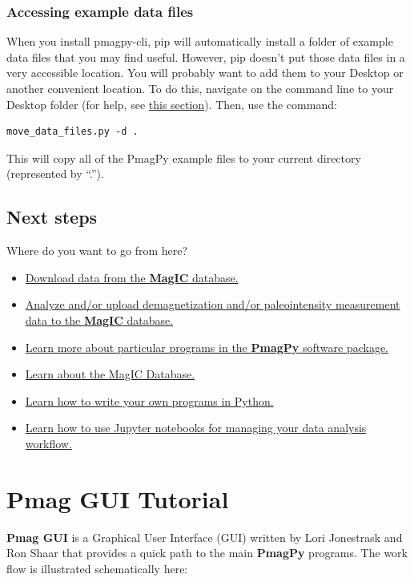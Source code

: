 \documentclass[11pt]{book}
\begin{document}
{   \subsection{Accessing example data files}
   When you install pmagpy-cli, pip will automatically install a folder of example data files that you may find useful.  However, pip doesn't put those data files in a very accessible location.  You will probably want to add them to your Desktop or another convenient location.
   To do this, navigate on the command line to your Desktop folder (for help, see \href{#file_system}{this section}).  Then, use the command: \begin{verbatim}move_data_files.py -d .\end{verbatim}This will copy all of the PmagPy example files to your current directory (represented by ``.'').  
     


 

 
\section{Next steps}

Where do you want to go from here?

\begin{itemize}
\item \href{#magic_download}{Download data from the {\bf MagIC} database.}
\item \href{#pmag_gui.py}{Analyze and/or upload demagnetization and/or paleointensity measurement data to the {\bf MagIC} database. }
\item \href{#PmagPy}{Learn more about particular programs in the {\bf PmagPy} software package.}
\item \href{#MagICDatabase}{Learn about the MagIC Database.}
\item \href{#Python}{Learn how to write your own programs in Python.}
\item \href{#Notebooks}{Learn how to use Jupyter notebooks for managing your data analysis workflow.}
\end{itemize}



\chapter{Pmag GUI Tutorial}
\label{chap:Pmag GUI}

{\bf Pmag GUI} is a Graphical User Interface (GUI) written by Lori Jonestrask and Ron Shaar  that provides a quick path to the main {\bf PmagPy} programs. The work flow is illustrated schematically here:

}
\end{document}
